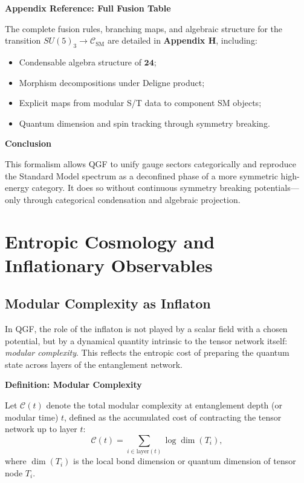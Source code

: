 \documentclass[11pt]{article}
\begin{document}
\vspace{0.5em}
\noindent\textbf{Appendix Reference: Full Fusion Table}

The complete fusion rules, branching maps, and algebraic structure for the transition \( SU(5)_3 \rightarrow \mathcal{C}_{\text{SM}} \) are detailed in \textbf{Appendix H}, including:

\begin{itemize}
  \item Condensable algebra structure of \( \mathbf{24} \);
  \item Morphism decompositions under Deligne product;
  \item Explicit maps from modular S/T data to component SM objects;
  \item Quantum dimension and spin tracking through symmetry breaking.
\end{itemize}

\vspace{0.5em}
\noindent\textbf{Conclusion}

This formalism allows QGF to unify gauge sectors categorically and reproduce the Standard Model spectrum as a deconfined phase of a more symmetric high-energy category. It does so without continuous symmetry breaking potentials—only through categorical condensation and algebraic projection.



\section{Entropic Cosmology and Inflationary Observables}

\subsection{Modular Complexity as Inflaton}

In QGF, the role of the inflaton is not played by a scalar field with a chosen potential, but by a dynamical quantity intrinsic to the tensor network itself: \textit{modular complexity}. This reflects the entropic cost of preparing the quantum state across layers of the entanglement network.

\vspace{0.5em}
\noindent\textbf{Definition: Modular Complexity}

Let \( \mathcal{C}(t) \) denote the total modular complexity at entanglement depth (or modular time) \( t \), defined as the accumulated cost of contracting the tensor network up to layer \( t \):
\[
\mathcal{C}(t) = \sum_{i \in \text{layer}(t)} \log \dim(T_i),
\]
where \( \dim(T_i) \) is the local bond dimension or quantum dimension of tensor node \( T_i \).
\end{document}
